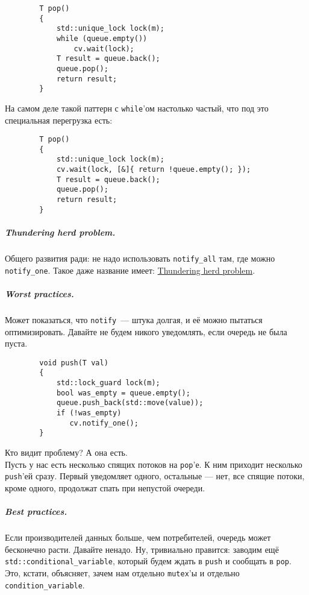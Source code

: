\documentclass{article}
\begin{document}
    \begin{verbatim}
        T pop()
        {
            std::unique_lock lock(m);
            while (queue.empty())
                cv.wait(lock);
            T result = queue.back();
            queue.pop();
            return result;
        }
    \end{verbatim}
    На самом деле такой паттерн с \texttt{while}'ом настолько частый, что под это специальная перегрузка есть:
    \begin{verbatim}
        T pop()
        {
            std::unique_lock lock(m);
            cv.wait(lock, [&]{ return !queue.empty(); });
            T result = queue.back();
            queue.pop();
            return result;
        }
    \end{verbatim}
    \subparagraph{Thundering herd problem.}
    Общего развития ради: не надо использовать \texttt{notify_all} там, где можно \texttt{notify_one}. Такое даже название имеет: \href{https://en.wikipedia.org/wiki/Thundering_herd_problem}{Thundering herd problem}.
    \subparagraph{Worst practices.}
    Может показаться, что \texttt{notify}~--- штука долгая, и её можно пытаться оптимизировать. Давайте не будем никого уведомлять, если очередь не была пуста.
    \begin{verbatim}
        void push(T val)
        {
            std::lock_guard lock(m);
            bool was_empty = queue.empty();
            queue.push_back(std::move(value));
            if (!was_empty)
               cv.notify_one();
        }
    \end{verbatim}
    Кто видит проблему? А она есть.\\
    Пусть у нас есть несколько спящих потоков на \texttt{pop}'е. К ним приходит несколько \texttt{push}'ей сразу. Первый уведомляет одного, остальные — нет, все спящие потоки, кроме одного, продолжат спать при непустой очереди.
    \subparagraph{Best practices.}
    Если производителей данных больше, чем потребителей, очередь может бесконечно расти. Давайте ненадо. Ну, тривиально правится: заводим ещё \texttt{std::conditional_variable}, который будем ждать в \texttt{push} и сообщать в \texttt{pop}. Это, кстати, объясняет, зачем нам отдельно \Verb|mutex|'ы и отдельно \Verb|condition_variable|.
\end{document}
